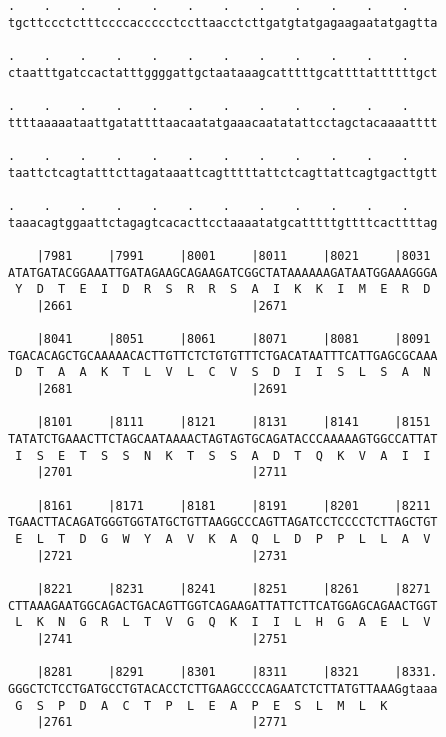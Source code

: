 \documentclass{article}
\begin{document}
\begin{Verbatim}
.    .    .    .    .    .    .    .    .    .    .    .    
tgcttccctctttccccaccccctccttaacctcttgatgtatgagaagaatatgagtta
                                                            
.    .    .    .    .    .    .    .    .    .    .    .    
ctaatttgatccactatttggggattgctaataaagcatttttgcattttattttttgct
                                                            
.    .    .    .    .    .    .    .    .    .    .    .    
ttttaaaaataattgatattttaacaatatgaaacaatatattcctagctacaaaatttt
                                                            
.    .    .    .    .    .    .    .    .    .    .    .    
taattctcagtatttcttagataaattcagtttttattctcagttattcagtgacttgtt
                                                            
.    .    .    .    .    .    .    .    .    .    .    .    
taaacagtggaattctagagtcacacttcctaaaatatgcatttttgttttcacttttag
                                                            
    |7981     |7991     |8001     |8011     |8021     |8031 
ATATGATACGGAAATTGATAGAAGCAGAAGATCGGCTATAAAAAAGATAATGGAAAGGGA
 Y  D  T  E  I  D  R  S  R  R  S  A  I  K  K  I  M  E  R  D 
    |2661                         |2671                     
  
    |8041     |8051     |8061     |8071     |8081     |8091 
TGACACAGCTGCAAAAACACTTGTTCTCTGTGTTTCTGACATAATTTCATTGAGCGCAAA
 D  T  A  A  K  T  L  V  L  C  V  S  D  I  I  S  L  S  A  N 
    |2681                         |2691                     
  
    |8101     |8111     |8121     |8131     |8141     |8151 
TATATCTGAAACTTCTAGCAATAAAACTAGTAGTGCAGATACCCAAAAAGTGGCCATTAT
 I  S  E  T  S  S  N  K  T  S  S  A  D  T  Q  K  V  A  I  I 
    |2701                         |2711                     
  
    |8161     |8171     |8181     |8191     |8201     |8211 
TGAACTTACAGATGGGTGGTATGCTGTTAAGGCCCAGTTAGATCCTCCCCTCTTAGCTGT
 E  L  T  D  G  W  Y  A  V  K  A  Q  L  D  P  P  L  L  A  V 
    |2721                         |2731                     
  
    |8221     |8231     |8241     |8251     |8261     |8271 
CTTAAAGAATGGCAGACTGACAGTTGGTCAGAAGATTATTCTTCATGGAGCAGAACTGGT
 L  K  N  G  R  L  T  V  G  Q  K  I  I  L  H  G  A  E  L  V 
    |2741                         |2751                     
  
    |8281     |8291     |8301     |8311     |8321     |8331.
GGGCTCTCCTGATGCCTGTACACCTCTTGAAGCCCCAGAATCTCTTATGTTAAAGgtaaa
 G  S  P  D  A  C  T  P  L  E  A  P  E  S  L  M  L  K       
    |2761                         |2771                     
  

\end{Verbatim}
\end{document}
